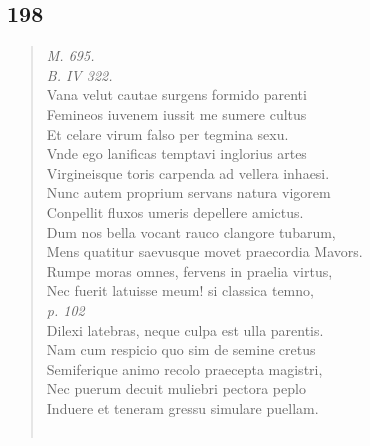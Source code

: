 \documentclass[11pt, a4paper]{report}
\begin{document}
            \subsection*{198}
      \begin{verse}
      \textit{M. 695.} \\ \textit{B. IV 322.} \\ Vana velut cautae surgens formido parenti \\ Femineos iuvenem iussit me sumere cultus \\ Et celare virum falso per tegmina sexu. \\ Vnde ego lanificas temptavi inglorius artes \\ Virgineisque toris carpenda ad vellera inhaesi. \\ Nunc autem proprium servans natura vigorem \\ Conpellit fluxos umeris depellere amictus. \\ Dum nos bella vocant rauco clangore tubarum, \\ Mens quatitur saevusque movet praecordia Mavors. \\ Rumpe moras omnes, fervens in praelia virtus, \\ Nec fuerit latuisse meum! si classica temno, \\ \textit{p. 102} \\ Dilexi latebras, neque culpa est ulla parentis. \\ Nam cum respicio quo sim de semine cretus \\ Semiferique animo recolo praecepta magistri, \\ Nec puerum decuit muliebri pectora peplo \\ Induere et teneram gressu simulare puellam. \\ 
        ﻿\pagebreak 

\end{verse}
\end{document}
